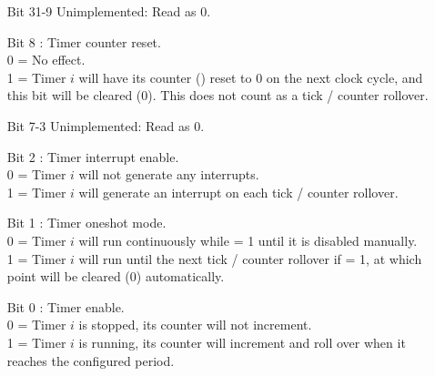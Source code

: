\vspace{-2mm}
\begin{itemize}[leftmargin=18mm,labelsep=3mm,parsep=1.5mm]
    \item[\footnotesize Bit 31-9] Unimplemented: Read as 0.
    \item[\footnotesize Bit 8] : Timer counter reset.\\{\footnotesize
    0 = No effect.\\
    1 = Timer $i$ will have its counter () reset to 0 on the next clock cycle, and this bit will be cleared (0). This does not count as a tick / counter rollover.}
    \item[\footnotesize Bit 7-3] Unimplemented: Read as 0.
    \item[\footnotesize Bit 2] : Timer interrupt enable.\\{\footnotesize
    0 = Timer $i$ will not generate any interrupts.\\
    1 = Timer $i$ will generate an interrupt on each tick / counter rollover.}
    \item[\footnotesize Bit 1] : Timer oneshot mode.\\{\footnotesize
    0 = Timer $i$ will run continuously while  = 1 until it is disabled manually.\\
    1 = Timer $i$ will run until the next tick / counter rollover if  = 1, at which point  will be cleared (0) automatically.}
    \item[\footnotesize Bit 0] : Timer enable.\\{\footnotesize
    0 = Timer $i$ is stopped, its counter will not increment.\\
    1 = Timer $i$ is running, its counter will increment and roll over when it reaches the configured period.}
\end{itemize}

